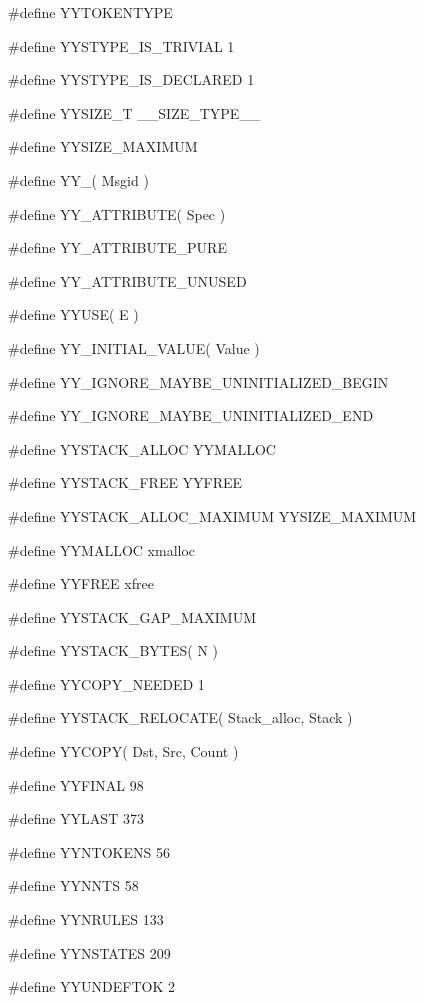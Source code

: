 \medskip
{\stt \#define YYTOKENTYPE}

\medskip
{\stt \#define YYSTYPE\_IS\_TRIVIAL 1}

\medskip
{\stt \#define YYSTYPE\_IS\_DECLARED 1}

\medskip
{\stt \#define YYSIZE\_T \_\_SIZE\_TYPE\_\_}

\medskip
{\stt \#define YYSIZE\_MAXIMUM}

\medskip
{\stt \#define YY\_( Msgid )}

\medskip
{\stt \#define YY\_ATTRIBUTE( Spec )}

\medskip
{\stt \#define YY\_ATTRIBUTE\_PURE}

\medskip
{\stt \#define YY\_ATTRIBUTE\_UNUSED}

\medskip
{\stt \#define YYUSE( E )}

\medskip
{\stt \#define YY\_INITIAL\_VALUE( Value )}

\medskip
{\stt \#define YY\_IGNORE\_MAYBE\_UNINITIALIZED\_BEGIN}

\medskip
{\stt \#define YY\_IGNORE\_MAYBE\_UNINITIALIZED\_END}

\medskip
{\stt \#define YYSTACK\_ALLOC YYMALLOC}

\medskip
{\stt \#define YYSTACK\_FREE YYFREE}

\medskip
{\stt \#define YYSTACK\_ALLOC\_MAXIMUM YYSIZE\_MAXIMUM}

\medskip
{\stt \#define YYMALLOC xmalloc}

\medskip
{\stt \#define YYFREE xfree}

\medskip
{\stt \#define YYSTACK\_GAP\_MAXIMUM}

\medskip
{\stt \#define YYSTACK\_BYTES( N )}

\medskip
{\stt \#define YYCOPY\_NEEDED 1}

\medskip
{\stt \#define YYSTACK\_RELOCATE( Stack\_alloc, Stack )}

\medskip
{\stt \#define YYCOPY( Dst, Src, Count )}

\medskip
{\stt \#define YYFINAL 98}

\medskip
{\stt \#define YYLAST 373}

\medskip
{\stt \#define YYNTOKENS 56}

\medskip
{\stt \#define YYNNTS 58}

\medskip
{\stt \#define YYNRULES 133}

\medskip
{\stt \#define YYNSTATES 209}

\medskip
{\stt \#define YYUNDEFTOK 2}

